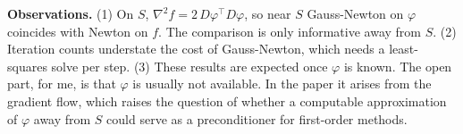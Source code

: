 \documentclass[10pt]{article}
\begin{document}
\textbf{Observations.}
(1) On $S$, $\nabla^2 f = 2\,D\varphi^\top D\varphi$, so near $S$ Gauss-Newton on $\varphi$ coincides with Newton on $f$. The comparison is only informative away from $S$.
(2) Iteration counts understate the cost of Gauss-Newton, which needs a least-squares solve per step.
(3) These results are expected once $\varphi$ is known. The open part, for me, is that $\varphi$ is usually not available. In the paper it arises from the gradient flow, which raises the question of whether a computable approximation of $\varphi$ away from $S$ could serve as a preconditioner for first-order methods.
\end{document}
